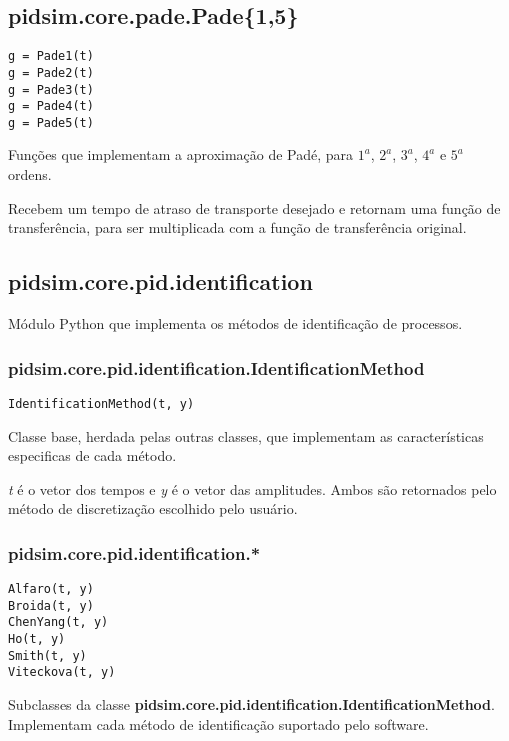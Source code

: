 \subsection{pidsim.core.pade.Pade\{1,5\}}

    \begin{verbatim}
g = Pade1(t)
g = Pade2(t)
g = Pade3(t)
g = Pade4(t)
g = Pade5(t)\end{verbatim}
    
    Funções que implementam a aproximação de Padé, para $1^a$, $2^a$, $3^a$,
    $4^a$ e $5^a$ ordens.
    
    Recebem um tempo de atraso de transporte desejado e retornam uma
    função de transferência, para ser multiplicada com a função de transferência
    original.

\subsection{pidsim.core.pid.identification}
    
    Módulo Python que implementa os métodos de identificação de processos.
    
    \subsubsection{pidsim.core.pid.identification.IdentificationMethod}
        
        \begin{verbatim}
IdentificationMethod(t, y)\end{verbatim}
        
        Classe base, herdada pelas outras classes, que implementam as
        características especificas de cada método.
        
        \textit{t} é o vetor dos tempos e \textit{y} é o vetor das amplitudes.
        Ambos são retornados pelo método de discretização escolhido pelo
        usuário.
    
    \subsubsection{pidsim.core.pid.identification.*}
        
        \begin{verbatim}
Alfaro(t, y)
Broida(t, y)
ChenYang(t, y)
Ho(t, y)
Smith(t, y)
Viteckova(t, y)\end{verbatim}
        
        Subclasses da classe \textbf{pidsim.core.pid.identification.IdentificationMethod}.
        Implementam cada método de identificação suportado pelo software.

